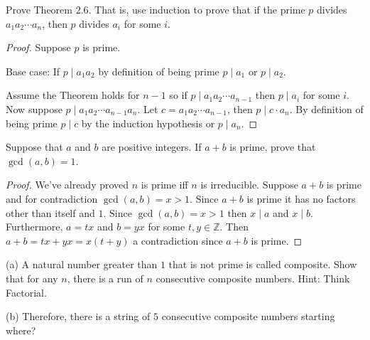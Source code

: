 \documentclass[8pt]{article}
\begin{document}
\begin{tcolorbox}[title=Problem 5, breakable]
    Prove Theorem $2.6$. That is, use induction to prove that if the 
    prime $p$ divides $a_1 a_2 \cdots a_n$, then $p$ divides $a_i$ for some $i$.
\end{tcolorbox}

\begin{proof}
    Suppose $p$ is prime.

    Base case: If $p \mid a_1 a_2$ by definition of being prime $p \mid a_1$ or $p \mid a_2$.

    Assume the Theorem holds for $n - 1$ so if $p \mid a_1 a_2 \cdots a_{n - 1}$ then $p \mid a_i$
    for some $i$. Now suppose $p \mid a_1 a_2 \cdots a_{n - 1} a_n$. Let $c = a_1 a_2 \cdots a_{n - 1}$,
    then $p \mid c \cdot a_n$. By definition of being prime $p \mid c$ by the induction hypothesis or $p \mid a_n$.
\end{proof}

\begin{tcolorbox}[title=Problem 6, breakable]
    Suppose that $a$ and $b$ are positive integers.
    If $a + b$ is prime, prove that $\gcd(a, b) = 1$.
\end{tcolorbox}

\begin{proof}
    We've already proved $n$ is prime iff $n$ is irreducible.
    Suppose $a + b$ is prime and for contradiction $\gcd(a, b) = x > 1$.
    Since $a + b$ is prime it has no factors other than itself and $1$.
    Since $\gcd(a, b) = x > 1$ then $x \mid a $ and $x \mid b$.
    Furthermore, $a = tx$ and $b = yx$ for some $t, y \in \mathbb{Z}$.
    Then $a + b = tx + yx = x(t + y)$ a contradiction since $a + b$ is prime.
\end{proof}

\begin{tcolorbox}[title=Problem 7, breakable]
    (a) A natural number greater than $1$ that is not prime 
    is called composite. Show that for any $n$, there is a run 
    of $n$ consecutive composite numbers. Hint: Think Factorial.
    
    (b) Therefore, there is a string of $5$ consecutive composite numbers 
        starting where?
\end{tcolorbox}
\end{document}
